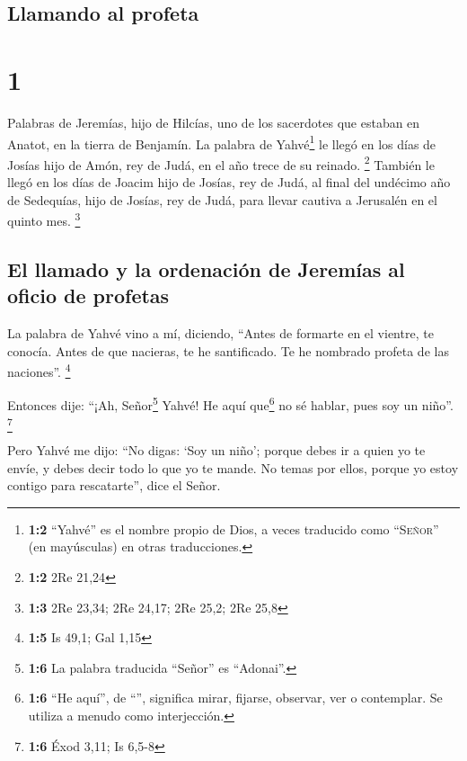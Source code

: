 \hypertarget{llamando-al-profeta}{%
\subsection{Llamando al profeta}\label{llamando-al-profeta}}

\hypertarget{section}{%
\section{1}\label{section}}

 Palabras de Jeremías, hijo de Hilcías, uno de los
sacerdotes que estaban en Anatot, en la tierra de Benjamín.
 La palabra de Yahvé\footnote{\textbf{1:2} ``Yahvé'' es el
  nombre propio de Dios, a veces traducido como ``\textsc{Señor}'' (en
  mayúsculas) en otras traducciones.} le llegó en los días de Josías
hijo de Amón, rey de Judá, en el año trece de su reinado. \footnote{\textbf{1:2}
  2Re 21,24}  También le llegó en los días de Joacim hijo
de Josías, rey de Judá, al final del undécimo año de Sedequías, hijo de
Josías, rey de Judá, para llevar cautiva a Jerusalén en el quinto mes.
\footnote{\textbf{1:3} 2Re 23,34; 2Re 24,17; 2Re 25,2; 2Re 25,8}

\hypertarget{el-llamado-y-la-ordenaciuxf3n-de-jeremuxedas-al-oficio-de-profetas}{%
\subsection{El llamado y la ordenación de Jeremías al oficio de
profetas}\label{el-llamado-y-la-ordenaciuxf3n-de-jeremuxedas-al-oficio-de-profetas}}

 La palabra de Yahvé vino a mí, diciendo, 
``Antes de formarte en el vientre, te conocía. Antes de que nacieras, te
he santificado. Te he nombrado profeta de las naciones''. \footnote{\textbf{1:5}
  Is 49,1; Gal 1,15}

 Entonces dije: ``¡Ah, Señor\footnote{\textbf{1:6} La
  palabra traducida ``Señor'' es ``Adonai''.} Yahvé! He aquí
que\footnote{\textbf{1:6} ``He aquí'', de ``'', significa
  mirar, fijarse, observar, ver o contemplar. Se utiliza a menudo como
  interjección.} no sé hablar, pues soy un niño''. \footnote{\textbf{1:6}
  Éxod 3,11; Is 6,5-8}

 Pero Yahvé me dijo: ``No digas: `Soy un niño'; porque
debes ir a quien yo te envíe, y debes decir todo lo que yo te mande.
 No temas por ellos, porque yo estoy contigo para
rescatarte'', dice el Señor.


